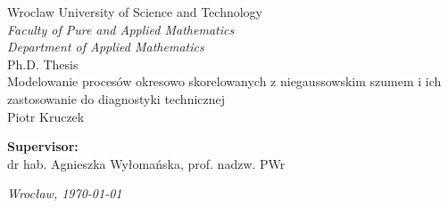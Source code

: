 \begin{titlepage}
	
	
	\begin{center}
		\fontsize{20pt}{25pt}\selectfont
		Wroclaw University of Science and Technology \\
		\fontsize{15pt}{15pt}\selectfont
		\textit{Faculty of Pure and Applied Mathematics}\\
		\textit{Department of Applied Mathematics}\\
		
		\vspace*{10\baselineskip}
		\fontsize{20pt}{25pt}\selectfont
		Ph.D. Thesis \\
		\vspace*{1.15\baselineskip}
		\fontsize{22pt}{25pt}\selectfont
		Modelowanie procesów okresowo skorelowanych z niegaussowskim szumem i ich zastosowanie do diagnostyki technicznej \\
		\vspace*{1.15\baselineskip}
		\fontsize{20pt}{15pt}\selectfont
      Piotr Kruczek\\
	\end{center}
	
	\vspace*{6.5\baselineskip}
	\begin{flushright}
		\fontsize{13pt}{10pt}\selectfont
		\textbf{Supervisor:} \\
		\vspace*{0.6\baselineskip}
		dr hab. Agnieszka Wy{\l}oma{\'n}ska, prof. nadzw. PWr\\
	\end{flushright}
	
	\vspace*{6\baselineskip}
	\begin{center}
		\fontsize{15pt}{15pt}\selectfont
		\textit{Wroc{\l}aw, \today}
	\end{center}
\end{titlepage}

\pagestyle{empty}